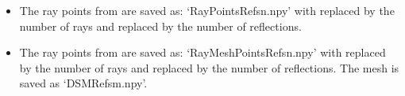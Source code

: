 \documentclass[letterpaper,10pt,english]{sphinxmanual}
\begin{document}
\begin{itemize}
\item {} 
The ray points from {\hyperref[\detokenize{index:RayTracerMainProgram.RayTracer}]{}} are saved as:
‘RayPointsRefsn.npy’ with  replaced by the     number of rays and  replaced by the number of reflections.

\item {} 
The ray points from {\hyperref[\detokenize{index:RayTracerMainProgram.MeshProgram}]{}} are saved as:
‘RayMeshPointsRefsn.npy’ with  replaced     by the     number of rays and  replaced by the number of reflections.     The mesh is saved as ‘DSMRefsm.npy’.

\end{itemize}
\end{document}
